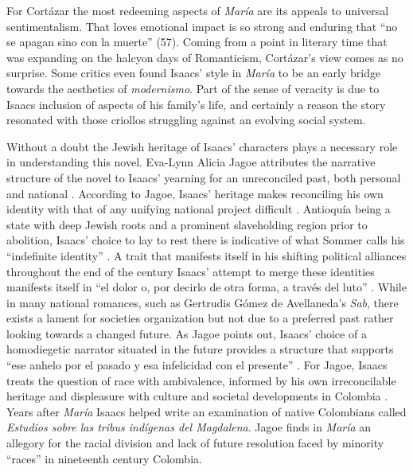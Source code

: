 \documentclass[12pt]{report}
\begin{document}
For Cortázar the most redeeming aspects of \textit{María} are its appeals to universal sentimentalism. 
That loves emotional impact is so strong and enduring that \enquote{no se apagan sino con la muerte} (57). 
Coming from a point in literary time that was expanding on the halcyon days of Romanticism, Cortázar's view comes as no surprise. 
Some critics even found Isaacs' style in \textit{María} to be an early bridge towards the aesthetics of \textit{modernismo}.
Part of the sense of veracity is due to Isaacs inclusion of aspects of his family's life, and certainly a reason the story resonated with those criollos struggling against an evolving social system. 


Without a doubt the Jewish heritage of Isaacs' characters plays a necessary role in understanding this novel. 
Eva-Lynn Alicia Jagoe attributes the narrative structure of the novel to Isaacs' yearning for an unreconciled past, both personal and national \autocite[145]{Jagoe2003}.
According to Jagoe, Isaacs' heritage makes reconciling his own identity with that of any unifying national project difficult \autocite[145]{Jagoe2003}.
Antioquía being a state with deep Jewish roots and a prominent slaveholding region prior to abolition, Isaacs' choice to lay to rest there is indicative of what Sommer calls his \enquote{indefinite identity} \autocite[269]{Sommer1997}.
A trait that manifests itself in his shifting political alliances throughout the end of the century \autocite[270]{Sommer1997}
Isaacs' attempt to merge these identities manifests itself in \enquote{el dolor o, por decirlo de otra forma, a través del luto} \autocite[145]{Jagoe2003}.
While in many national romances, such as Gertrudis Gómez de Avellaneda's \textit{Sab}, there exists a lament for societies organization but not due to a preferred past rather looking towards a changed future.
As Jagoe points out, Isaacs' choice of a homodiegetic narrator situated in the future provides a structure that supports \enquote{ese anhelo por el pasado y esa infelicidad con el presente} \autocite[147]{Jagoe2003}.
For Jagoe, Isaacs treats the question of race with ambivalence, informed by his own irreconcilable heritage and displeasure with culture and societal developments in Colombia \autocite[158]{Jagoe2003}.
Years after \textit{María} Isaacs helped write an examination of native Colombians called \textit{Estudios sobre las tribus indígenas del Magdalena}.
Jagoe finds in \textit{María} an allegory for the racial division and lack of future resolution faced by minority \enquote{races} in nineteenth century Colombia.
\end{document}
